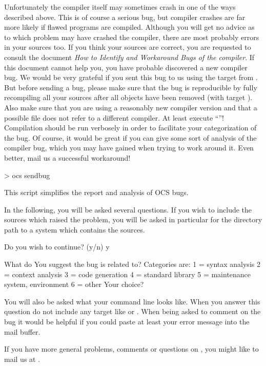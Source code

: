 Unfortunately the \opal{} compiler itself may sometimes crash in one of the ways
described above. This is of course a serious bug, but compiler crashes are far
more likely if flawed programs are compiled. Although you will get no 
advice as to which problem may have crashed the compiler, there are
most probably errors in your sources too. If you think your sources are
correct, you are requested to consult the document {\em How to Identify and
Workaround Bugs of the \opal{} compiler}. If this document cannot help you,
you have probable discovered a new compiler bug. We would be very
grateful if you sent this bug to us using the  target from
. But before sending a bug, please make sure that the bug is
reproducible by 
fully recompiling all your sources after all objects have been removed (with
target ). Also make sure that you are using a reasonably
new compiler version and that a possible  file does not
refer to 
a different compiler. At least execute ``''! Compilation
should be run verbosely  in order to facilitate your categorization
of the bug.
Of course, it would be great if you can give some sort of analysis of the
compiler 
bug, which you may have gained when trying to work around it. Even better,
mail us a successful workaround!

\begin{prog}
> ocs sendbug

This script simplifies the report and analysis of OCS bugs.

In the following, you will be asked several questions. If you
wish to include the sources which raised the problem, you
will be asked in particular for the directory path to a
system which contains the sources.


Do you wish to continue? (y/n) y

What do You suggest the bug is related to?
Categories are:
 1 = syntax analysis
 2 = context analysis
 3 = code generation
 4 = standard library
 5 = maintenance system, environment
 6 = other
Your choice? 
\end{prog}
You will also be asked what your  command line looks like. 
When you answer this question do not include any target like  or . When being asked to comment on the bug it would be
helpful 
if you could paste at least your error message into the mail buffer.
 
If you have more general problems, comments or questions on \opal{},
you might like to mail us at .


